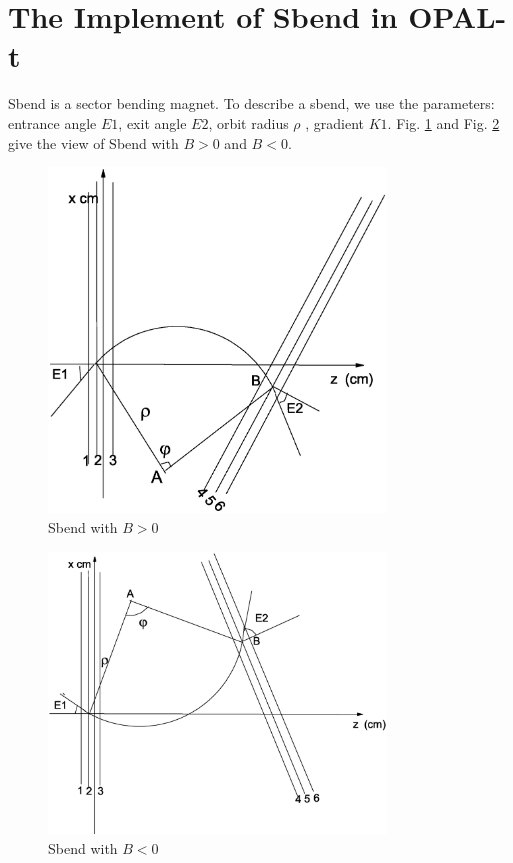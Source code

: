 \documentclass{article}
\begin{document}
\section{The Implement of Sbend in OPAL-t}
Sbend is a sector bending magnet. To describe a sbend, we use the
parameters: entrance angle $E1$, exit angle $E2$, orbit radius
$\rho$ , gradient $K1$. Fig. \ref{fig:posi} and Fig. \ref{fig:neg}
give the view of Sbend with $B>0$ and $B<0$.
\begin{figure}[H]
\begin{center}
\includegraphics*[width=0.8\textwidth]{posi}
\end{center}
\caption{Sbend with $B>0$ } \label{fig:posi}
\end{figure}

\begin{figure}[H]
\begin{center}
\includegraphics*[width=0.8\textwidth]{neg}
\end{center}
\caption{Sbend with $B<0$ } \label{fig:neg}
\end{figure}
\end{document}
